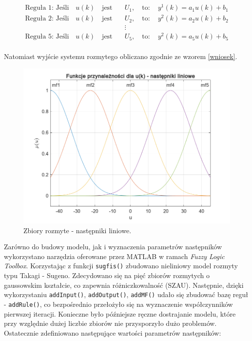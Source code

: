 \begin{equation}
\begin{aligned}
\text{Reguła 1: Jeśli} \quad u(k) \quad \text{jest} \quad &U_1, \quad \text{to}: \quad y^1(k) = a_1 u(k) + b_1 \\[10pt]
\text{Reguła 2: Jeśli} \quad u(k) \quad \text{jest} \quad &U_2, \quad \text{to}: \quad y^2(k) = a_2 u(k) + b_2 \\[10pt]
&\vdots \\[10pt]
\text{Reguła 5: Jeśli} \quad u(k) \quad \text{jest} \quad &U_5, \quad \text{to}: \quad y^2(k) = a_5 u(k) + b_5 \\[10pt]
\end{aligned}
\label{nastepniki_lin}
\end{equation}

\noindent Natomiast wyjście systemu rozmytego obliczano zgodnie ze wzorem \ref{wniosek}.

\newpage

\begin{figure}[h!]
\centering
\includegraphics[width=\textwidth]{pictures/hamm_linearFis}
\caption{Zbiory rozmyte - następniki liniowe.}
\end{figure}

Zarówno do budowy modelu, jak i wyznaczenia parametrów następników wykorzystano narzędzia oferowane przez MATLAB w ramach \textit{Fuzzy Logic Toolbox}. Korzystając z funkcji \verb+sugfis()+ zbudowano nieliniowy model rozmyty typu Takagi - Sugeno. Zdecydowano się na pięć zbiorów rozmytych o gaussowskim kształcie, co zapewnia różniczkowalność (SZAU). Następnie, dzięki wykorzystaniu \verb+addInput()+, \verb+addOutput()+, \verb+addMF()+ udało się zbudować bazę reguł - \verb+addRule()+, co bezpośrednio przełożyło się na wyznaczenie współczynników pierwszej iteracji. Konieczne było późniejsze ręczne dostrajanie modelu, które przy względnie dużej liczbie zbiorów nie przysporzyło dużo problemów. Ostatecznie zdefiniowano następujące wartości parametrów następników:

